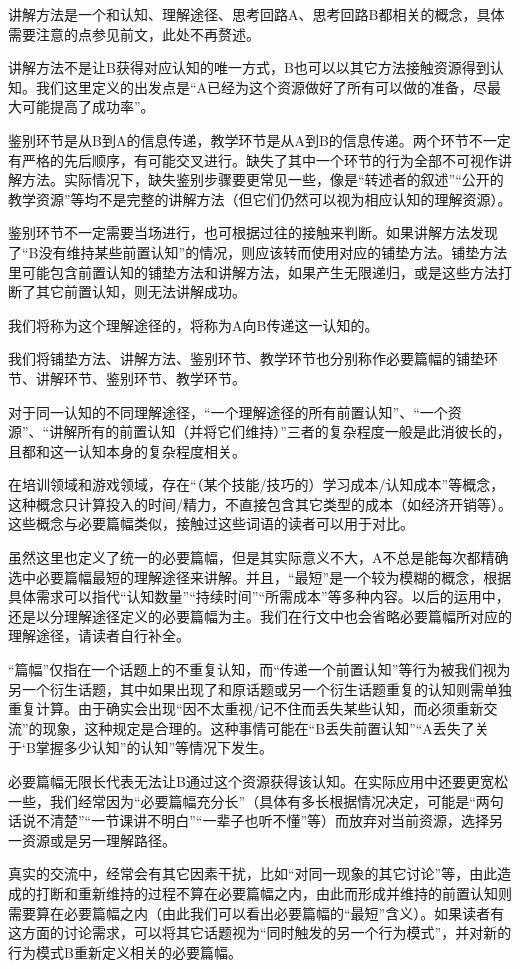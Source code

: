 \begin{explain}
讲解方法是一个和认知、理解途径、思考回路A、思考回路B都相关的概念，具体需要注意的点参见前文，此处不再赘述。

讲解方法不是让B获得对应认知的唯一方式，B也可以以其它方法接触资源得到认知。我们这里定义的出发点是“A已经为这个资源做好了所有可以做的准备，尽最大可能提高了成功率”。

鉴别环节是从B到A的信息传递，教学环节是从A到B的信息传递。两个环节不一定有严格的先后顺序，有可能交叉进行。缺失了其中一个环节的行为全部不可视作讲解方法。实际情况下，缺失鉴别步骤要更常见一些，像是“转述者的叙述”“公开的教学资源”等均不是完整的讲解方法（但它们仍然可以视为相应认知的理解资源）。

鉴别环节不一定需要当场进行，也可根据过往的接触来判断。如果讲解方法发现了“B没有维持某些前置认知”的情况，则应该转而使用对应的铺垫方法。铺垫方法里可能包含前置认知的铺垫方法和讲解方法，如果产生无限递归，或是这些方法打断了其它前置认知，则无法讲解成功。
\end{explain}
我们将称为这个理解途径的，将称为A向B传递这一认知的。
\begin{explain}
我们将铺垫方法、讲解方法、鉴别环节、教学环节也分别称作必要篇幅的铺垫环节、讲解环节、鉴别环节、教学环节。

对于同一认知的不同理解途径，“一个理解途径的所有前置认知”、“一个资源”、“讲解所有的前置认知（并将它们维持）”三者的复杂程度一般是此消彼长的，且都和这一认知本身的复杂程度相关。

在培训领域和游戏领域，存在“（某个技能/技巧的）学习成本/认知成本”等概念，这种概念只计算投入的时间/精力，不直接包含其它类型的成本（如经济开销等）。这些概念与必要篇幅类似，接触过这些词语的读者可以用于对比。

虽然这里也定义了统一的必要篇幅，但是其实际意义不大，A不总是能每次都精确选中必要篇幅最短的理解途径来讲解。并且，“最短”是一个较为模糊的概念，根据具体需求可以指代“认知数量”“持续时间”“所需成本”等多种内容。以后的运用中，还是以分理解途径定义的必要篇幅为主。我们在行文中也会省略必要篇幅所对应的理解途径，请读者自行补全。

“篇幅”仅指在一个话题上的不重复认知，而“传递一个前置认知”等行为被我们视为另一个衍生话题，其中如果出现了和原话题或另一个衍生话题重复的认知则需单独重复计算。由于确实会出现“因不太重视/记不住而丢失某些认知，而必须重新交流”的现象，这种规定是合理的。这种事情可能在“B丢失前置认知”“A丢失了关于‘B掌握多少认知”的认知”等情况下发生。

必要篇幅无限长代表无法让B通过这个资源获得该认知。在实际应用中还要更宽松一些，我们经常因为“必要篇幅充分长”（具体有多长根据情况决定，可能是“两句话说不清楚”“一节课讲不明白”“一辈子也听不懂”等）而放弃对当前资源，选择另一资源或是另一理解路径。

真实的交流中，经常会有其它因素干扰，比如“对同一现象的其它讨论”等，由此造成的打断和重新维持的过程不算在必要篇幅之内，由此而形成并维持的前置认知则需要算在必要篇幅之内（由此我们可以看出必要篇幅的“最短”含义）。如果读者有这方面的讨论需求，可以将其它话题视为“同时触发的另一个行为模式”，并对新的行为模式B重新定义相关的必要篇幅。
\end{explain}

